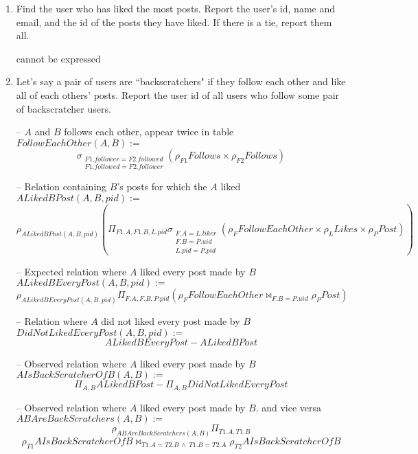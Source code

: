 \documentclass{article}
\newcommand{\var}[1]{\mathit{#1}}
\begin{document}
\begin{enumerate}
{}

\item   %
Find the user who has liked the most posts. 
Report the user's id, name and email, and the id of the posts they have liked. 
If there is a tie, report them all.

cannot be expressed

\item   %
Let's say a pair of users are ``backscratchers" 
if they follow each other and like all of each others' posts. 
Report the user id of all users who follow some pair of backscratcher users.

{\large 

-- $A$ and $B$ follows each other, appear twice in table  \\ 
$\var{FollowEachOther}(A,B) :=$
\[
    \sigma_{
        \substack{
            F1.follower=F2.followed\\
            F1.followed=F2.follower
        }
    } \left( \rho_{F1} \var{Follows} \times \rho_{F2} \var{Follows} \right)
\]


-- Relation containing $B$'s posts for which the $A$ liked  \\ 
$\var{ALikedBPost}(A,B,pid) :=$
\[
    \rho_{ALikedBPost(A,B,pid)}
    \left(
        \Pi_{F1.A, F1.B, L.pid}
        \sigma_{
            \substack{  
                F.A=L.liker\\
                F.B=P.uid \\
                L.pid=P.pid
            }
        }
        (\rho_{F} \var{FollowEachOther} \times \rho_{L} \var{Likes}\times \rho_{P} \var{Post})
    \right)
\]

-- Expected relation where $A$ liked every post made by $B$ \\ 
$\var{ALikedBEveryPost}(A,B,pid) :=$ 
\[
    \rho_{ALikedBEveryPost(A,B,pid)}
    \Pi_{F.A, F.B, P.pid} (\rho_{F} \var{FollowEachOther} \bowtie_{F.B=P.uid} \rho_{P} \var{Post})
\]


-- Relation where $A$ did not liked every post made by $B$ \\ 
$\var{DidNotLikedEveryPost}(A,B, pid) :=$
\[
    \var{ALikedBEveryPost} - \var{ALikedBPost}
\]

-- Observed relation where $A$ liked every post made by $B$\\
$\var{AIsBackScratcherOfB}(A,B) :=$
\[
    \Pi_{A,B} \var{ALikedBPost} - \Pi_{A,B} \var{DidNotLikedEveryPost}
\]

-- Observed relation where $A$ liked every post made by $B$. and vice versa\\
$\var{ABAreBackScratchers}(A,B) :=$
\[
    \rho_{\var{ABAreBackScratchers}(A,B)} \Pi_{T1.A, T1.B}
\]
\[
    \rho_{T1} \var{AIsBackScratcherOfB} \bowtie_{T1.A=T2.B \,\land\, T1.B=T2.A} \rho_{T2} \var{AIsBackScratcherOfB}
\]


}
\end{enumerate}
\end{document}
